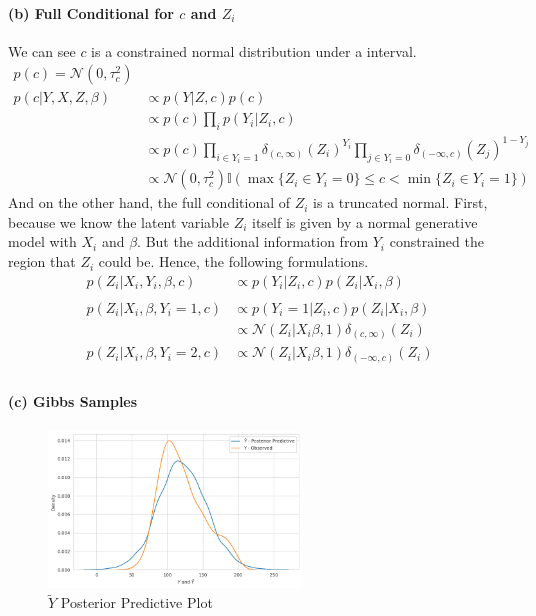 \documentclass[11pt, letterpaper]{article}
\begin{document}
\paragraph{(b) Full Conditional for $c$ and $Z_i$}
We can see $c$ is a constrained normal distribution under a interval.
\begin{align*}
    p(c) = \mathcal{N}(0, \tau_c^2) \\
    p(c|Y, X, Z, \beta) &\propto p(Y|Z, c) p(c) \\
        &\propto p(c) \prod_i p(Y_i|Z_i, c) \\
        &\propto p(c) \prod_{i \in Y_i=1} \delta_{(c,\infty)}(Z_i)^{Y_i} \prod_{j \in Y_i=0} \delta_{(-\infty,c)}(Z_j)^{1-Y_j} \\
        &\propto \mathcal{N}(0, \tau_c^2) \mathbb{I}(\max\{Z_i \in Y_i=0\} \leq c < \min\{Z_i \in Y_i=1\}) 
\end{align*}
And on the other hand, the full conditional of $Z_i$ is a truncated normal. First, because we know the latent variable $Z_i$ itself is given by a normal generative model with $X_i$ and $\beta$. But the additional information from $Y_i$ constrained the region that $Z_i$ could be. Hence, the following formulations.
\begin{align*}
    p(Z_i|X_i,Y_i,\beta,c) &\propto p(Y_i|Z_i, c) p(Z_i|X_i, \beta) \\ \\
    p(Z_i|X_i,\beta,Y_i=1,c) &\propto p(Y_i=1|Z_i, c) p(Z_i|X_i, \beta) \\
        &\propto \mathcal{N}(Z_i|X_i\beta, 1)\delta_{(c,\infty)}(Z_i) \\
    p(Z_i|X_i,\beta,Y_i=2,c) &\propto \mathcal{N}(Z_i|X_i\beta, 1)\delta_{(-\infty,c)}(Z_i) \\
\end{align*}

\paragraph{(c) Gibbs Samples}
\begin{figure}[!h]
  \centering
  \includegraphics[width=0.6\textwidth]{6.2.3.png}
  \captionsetup{justification=centering}
  \caption{$\tilde{Y}$ Posterior Predictive Plot}
\end{figure}
\end{document}
